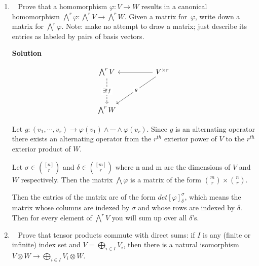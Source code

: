 \documentclass[11pt]{article}
\newcommand\score[1]{\marginpar{\vspace{-2ex}\color{blue}{#1/3}}\hspace{-1ex}}
\newcommand\0{\mathbf{0}}
\newcommand\<{\langle}
\renewcommand\>{\rangle}
\begin{document}
\begin{enumerate}
Then $\varphi \otimes \psi$ can be represented as.\\

\begin{align*}
\begin{bmatrix}
  \alpha_{11}\beta_{11} & \cdots & \alpha_{n1} \beta_{m1}\\
  \cdots& \cdots& \cdots\\
  \alpha_{1n^{'}}\beta_{1m^{'}}& \cdots & \alpha_{nn^{'}}\beta_{mm^{'}}
\end{bmatrix}
\end{align*}

This is matrix is awfully similar to the Kronecker product.

\item\ \score{}%
Prove that a homomorphism $\varphi: V \to W$ results in a canonical
homomorphism $\bigwedge^r \varphi: \bigwedge^r V \to \bigwedge^r W$.
Given a matrix for~$\varphi$, write down a matrix for $\bigwedge^r
\varphi$.  Note: make no attempt to draw a matrix; just describe its
entries as labeled by pairs of basis vectors.

\textbf{Solution}

\[\begin{tikzcd}
	{\bigwedge^{r} V} && {V^{\times r}} \\
	\\
	{\bigwedge^{r} W}
  \arrow["{\exists! f}"{description}, dashed, from=1-1, to=3-1]
	\arrow[from=1-3, to=1-1]
	\arrow["g"{description}, from=1-3, to=3-1]
\end{tikzcd}\]

Let $g: (v_{1},\cdots , v_{r}) \rightarrow \varphi(v_{1}) \wedge \cdots \wedge \varphi(v_{r})$. 
Since $g$ is an alternating operator there exists an alternating operator from the $r^{th}$ exterior 
power of $V$ to the $r^{th}$ exterior product of $W$.

Let $ \sigma \in \binom{[n]}{r}$ and $\delta \in \binom{[m]}{r}$ where n and m are the dimensions of
$V$ and $W$ respectively. Then the matrix $\bigwedge \varphi$ is a matrix of the form $\binom{m}{r} \times \binom{n}{r}$.

Then the entries of the matrix are of the form $det [\varphi]^{\sigma}_{\delta}$, which means
the matrix whose columns are indexed by $\sigma$ and whose rows are indexed by $\delta$. Then for every 
element of $\bigwedge^{r} V$ you will sum up over all $\delta$'s.



\item\ \score{}%
Prove that tensor products commute with direct sums: if $I$ is any
(finite or infinite) index set and $V = \bigoplus_{i \in I} V_i$,
then there is a natural isomorphism $V \otimes W \to\bigoplus_{i\in I}
V_i \otimes W$.


\end{enumerate}
\end{document}
